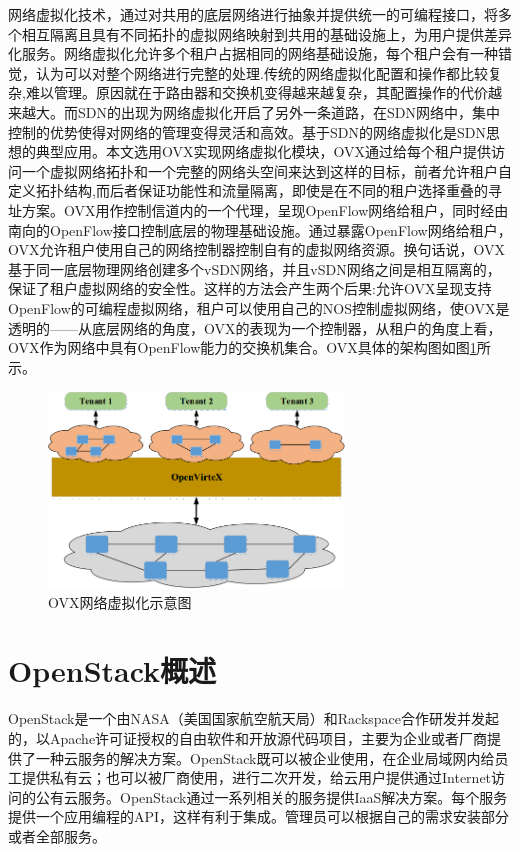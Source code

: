 网络虚拟化技术\cite{Virtual-1}，通过对共用的底层网络进行抽象并提供统一的可编程接口，将多个相互隔离且具有不同拓扑的虚拟网络映射到共用的基础设施上，为用户提供差异化服务。网络虚拟化允许多个租户占据相同的网络基础设施，每个租户会有一种错觉，认为可以对整个网络进行完整的处理.传统的网络虚拟化配置和操作都比较复杂,难以管理。原因就在于路由器和交换机变得越来越复杂，其配置操作的代价越来越大。而SDN的出现为网络虚拟化开启了另外一条道路，在SDN网络中，集中控制的优势使得对网络的管理变得灵活和高效。基于SDN的网络虚拟化是SDN思想的典型应用。本文选用OVX实现网络虚拟化模块，OVX通过给每个租户提供访问一个虚拟网络拓扑和一个完整的网络头空间来达到这样的目标，前者允许租户自定义拓扑结构,而后者保证功能性和流量隔离，即使是在不同的租户选择重叠的寻址方案。OVX用作控制信道内的一个代理，呈现OpenFlow网络给租户，同时经由南向的OpenFlow接口控制底层的物理基础设施。通过暴露OpenFlow网络给租户，OVX允许租户使用自己的网络控制器控制自有的虚拟网络资源。换句话说，OVX基于同一底层物理网络创建多个vSDN网络，并且vSDN网络之间是相互隔离的，保证了租户虚拟网络的安全性。这样的方法会产生两个后果:允许OVX呈现支持OpenFlow的可编程虚拟网络，租户可以使用自己的NOS控制虚拟网络，使OVX是透明的——从底层网络的角度，OVX的表现为一个控制器，从租户的角度上看，OVX作为网络中具有OpenFlow能力的交换机集合\cite{OVX-2}。OVX具体的架构图如图\ref{fig:ovx}所示。

\begin{figure}[!htb]
  \centering
  \includegraphics[width=0.7\textwidth]{logo/ovx.png}
  \caption{OVX网络虚拟化示意图}
  \label{fig:ovx}
\end{figure}

\section{OpenStack概述}

OpenStack是一个由NASA（美国国家航空航天局）和Rackspace合作研发并发起的，以Apache许可证授权的自由软件和开放源代码项目，主要为企业或者厂商提供了一种云服务的解决方案。OpenStack既可以被企业使用，在企业局域网内给员工提供私有云；也可以被厂商使用，进行二次开发，给云用户提供通过Internet访问的公有云服务。OpenStack通过一系列相关的服务提供IaaS解决方案。每个服务提供一个应用编程的API，这样有利于集成。管理员可以根据自己的需求安装部分或者全部服务。

